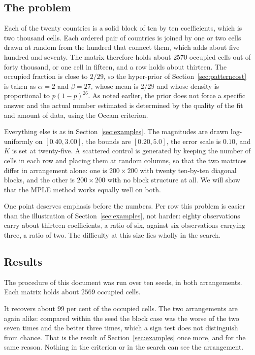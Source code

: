 \subsection{The problem}

Each of the twenty countries is a solid block of ten by ten coefficients, which is
two thousand cells. Each ordered pair of countries is joined by one or two cells
drawn at random from the hundred that connect them, which adds about five hundred
and seventy. The matrix therefore holds about $2570$ occupied cells out of forty
thousand, or one cell in fifteen, and a row holds about thirteen. The occupied
fraction is close to $2/29$, so the hyper-prior of Section~\ref{sec:patterncost} is
taken as $\alpha = 2$ and $\beta = 27$, whose mean is $2/29$ and whose density is
proportional to $p (1-p)^{26}$. As noted earlier, the prior does not force a specific answer
and the actual number estimated is determined by the quality of the fit and amount of
data, using the Occam criterion.

Everything else is as in Section~\ref{sec:examples}. The magnitudes are drawn
log-uniformly on $[0.40, 3.00]$, the bounds are $[0.20, 5.0]$, the error scale is
$0.10$, and $K$ is set at twenty-five. A scattered control is generated by keeping
the number of cells in each row and placing them at random columns, so that the two
matrices differ in arrangement alone: one is $200 \times 200$ with twenty ten-by-ten diagonal
blocks, and the other is  $200 \times 200$ with no block structure at all. We will show
that the MPLE method works equally well on both.

One point deserves emphasis before the numbers. Per row this problem is easier than
the illustration of Section~\ref{sec:examples}, not harder: eighty observations
carry about thirteen coefficients, a ratio of six, against six observations carrying
three, a ratio of two. The difficulty at this size lies wholly in the search.

\subsection{Results}

The procedure of this document was run over ten seeds, in both arrangements. Each
matrix holds about $2569$ occupied cells.



It recovers about $99$ per cent of the occupied cells. The two arrangements are
again alike: compared within the seed the block case was the worse of the two seven
times and the better three times, which a sign test does not distinguish from
chance. That is the result of Section~\ref{sec:examples} once more, and for the same
reason. Nothing in the criterion or in the search can see the arrangement.

